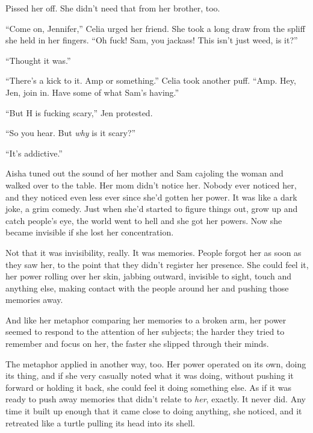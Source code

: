Pissed her off.  She didn't need that from her brother, too.



``Come on, Jennifer,'' Celia urged her friend.  She took a long draw from the spliff she held in her fingers. ``Oh fuck!  Sam, you jackass!  This isn't just weed, is it?''



``Thought it was.''



``There's a kick to it.  Amp or something.''  Celia took another puff.  ``Amp.  Hey, Jen, join in. Have some of what Sam's having.''



``But H is fucking scary,'' Jen protested.



``So you hear.  But \emph{why }is it scary?''



``It's addictive.''



Aisha tuned out the sound of her mother and Sam cajoling the woman and walked over to the table.  Her mom didn't notice her.  Nobody ever noticed her, and they noticed even less ever since she'd gotten her power.  It was like a dark joke, a grim comedy.  Just when she'd started to figure things out, grow up and catch people's eye, the world went to hell and she got her powers.  Now she became invisible if she lost her concentration.



Not that it was invisibility, really.  It was memories.  People forgot her as soon as they saw her, to the point that they didn't register her presence.  She could feel it, her power rolling over her skin, jabbing outward, invisible to sight, touch and anything else, making contact with the people around her and pushing those memories away.



And like her metaphor comparing her memories to a broken arm, her power seemed to respond to the attention of her subjects; the harder they tried to remember and focus on her, the faster she slipped through their minds.



The metaphor applied in another way, too.  Her power operated on its own, doing its thing, and if she very casually noted what it was doing, without pushing it forward or holding it back, she could feel it doing something else.  As if it was ready to push away memories that didn't relate to \emph{her}, exactly.  It never did.  Any time it built up enough that it came close to doing anything, she noticed, and it retreated like a turtle pulling its head into its shell.



